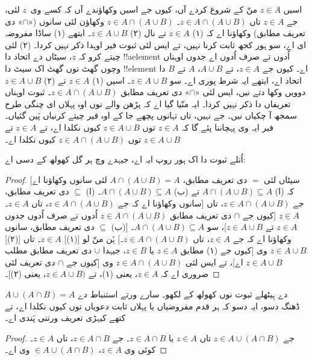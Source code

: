 \documentclass[../../../include/open-logic-section]{subfiles}
\begin{document}
اسیں $z \in A$ منّ کے شروع کردے آں، کیوں جے اسیں وکھاؤندے آں کہ کسے وی~$z$ لئی، جے $z \in A$ تاں $z \in A \cap (A \cup B)$۔ $z
\in A \cap (A \cup B)$ وکھاؤن لئی سانوں («$\cap$» دی تعریف مطابق) وکھاؤنا اے کہ (۱) $z \in A$ تے نال (۲) $z \in A \cup B$۔ ایتھے (۱) ساڈا مفروضہ ای اے، سو ہور کجھ ثابت کرنا نہیں، تے ایس لئی ثبوت فیر اوہدا ذکر نہیں کردا۔ (۲) لئی چیتے کرو کہ $z$، سیٹاں دے اتحاد دا !!a{element} اُدوں تے صرف اُدوں اے جدوں اوہناں وچوں گھٹ توں گھٹ اک سیٹ دا !!{element} اے۔ کیوں جے $z \in A$، تے $A \cup B$، $A$ تے $B$ دا اتحاد اے، ایتھے ایہ شرط پوری اے۔ سو $z \in A \cup B$۔ اسیں (۱) $z \in A$ تے (۲) $z \in A \cup B$ دوویں وکھا دتے نیں، ایس لئی «$\cap$» دی تعریف مطابق $z \in A \cap (A \cup B)$۔ ثبوت اوہناں تعریفاں دا ذکر نہیں کردا۔ ایہ منّیا گیا اے کہ پڑھن والے نوں اوہ پہلاں ای چنگی طرح سمجھ آ چکیاں نیں۔ جے نہیں، تاں تہانوں پچھے جا کے اوہ فیر چیتے کرنیاں پَین گئیاں۔ فیر ایہ وی پہچاننا پئے گا کہ $z
\in A$ توں $z \in A \cup B$ کیوں نکلدا اے، تے $z \in A$ تے $z \in A \cup B$ توں $z \in A \cap (A \cup B)$ کیوں نکلدا اے۔

اُتلے ثبوت دا اک ہور روپ ایہ اے، جیہدے وچ ہر گل کھولھ کے دسی اے:
\begin{proof}{}
[سیٹاں لئی $=$ دی تعریف مطابق، $A \cap (A \cup B) = A$ لئی سانوں وکھاؤنا اے کہ (ا) $A \cap (A \cup B) \subseteq A$ تے (ب) $A \cap (A \cup B)
  \subseteq A$۔ (ا) $\subseteq$ دی تعریف مطابق، سانوں وکھاؤنا اے کہ جے $z \in A \cap (A \cup B)$، تاں $z \in A$۔] جے $z \in A
\cap (A \cup B)$، تاں $z \in A$ [کیوں جے $\cap$ دی تعریف مطابق $z
  \in A \cap (A \cup B)$ اُدوں تے صرف اُدوں جدوں $z \in A$ تے $z \in A \cup B$]، سو $A
\cap (A \cup B) \subseteq A$۔ [(ب) $\subseteq$ دی تعریف مطابق، سانوں وکھاؤنا اے کہ جے $z \in A$، تاں $z \in A \cap (A \cup B)$۔] ہُن منّ لو [(۱)] $z \in A$۔ تاں [(۲)] $z \in A \cup B$ وی [کیوں جے (۱) مطابق $z \in A$ یا $z \in B$، جیہدا $\cup$ دی تعریف مطابق مطلب $z
  \in A \cup B$ اے]، تے ایس لئی $z \in A \cap (A \cup B)$ وی [کیوں جے $\cap$ دی تعریف لئی ضروری اے کہ $z \in A$، یعنی (۱)، تے $z
  \in A \cup B)$، یعنی (۲)]۔
\end{proof}

\begin{prob}
$A \cup (A \cap B) = A$ دے ہِیٹھلے ثبوت نوں کھولھ کے لکھو۔ سارے ورتے استنباط دے ڈھنگ دسو، ایہ دسو کہ ہر قدم مفروضیاں یا پہلاں ثابت دعویاں توں کیوں نکلدا اے، تے کتھے کیہڑی تعریف ورتنی پَندی اے۔
\begin{proof}
  جے $z \in A \cup (A \cap B)$ تاں $z \in A$ یا $z \in A \cap B$۔ جے $z \in A \cap B$، تاں $z \in A$۔ کوئی وی $z \in A$، $\in A \cup (A
  \cap B)$ وی اے۔
\end{proof}
\end{prob}
\end{document}
